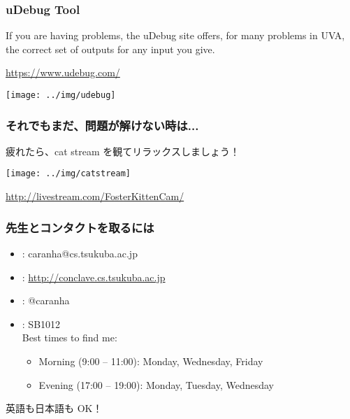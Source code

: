 \documentclass{beamer}
\begin{document}
\begin{frame}
  \frametitle{uDebug Tool}

  If you are having problems, the uDebug site offers, for many
  problems in UVA, the correct set of outputs for any input you give.

  \bigskip

  \url{https://www.udebug.com/}

  \bigskip

  \begin{center}
    \texttt{[image: ../img/udebug]}
  \end{center}
\end{frame}

\begin{frame}
  \frametitle{それでもまだ、問題が解けない時は...}

  疲れたら、cat stream を観てリラックスしましょう！

  \bigskip

  \begin{center}
    \texttt{[image: ../img/catstream]}
  \end{center}

  \bigskip

  \url{http://livestream.com/FosterKittenCam/}
\end{frame}


\begin{frame}
  \frametitle{先生とコンタクトを取るには}
  \begin{itemize}
  \item {}: caranha@cs.tsukuba.ac.jp
  \item {}: \url{http://conclave.cs.tsukuba.ac.jp}
  \item {}: @caranha

    \bigskip

  \item {}: SB1012\\
    Best times to find me:
    \begin{itemize}
    \item Morning (9:00 -- 11:00): Monday, Wednesday, Friday
    \item Evening (17:00 -- 19:00): Monday, Tuesday, Wednesday
    \end{itemize}
  \end{itemize}

  \bigskip

  英語も日本語も OK！
\end{frame}
\end{document}
